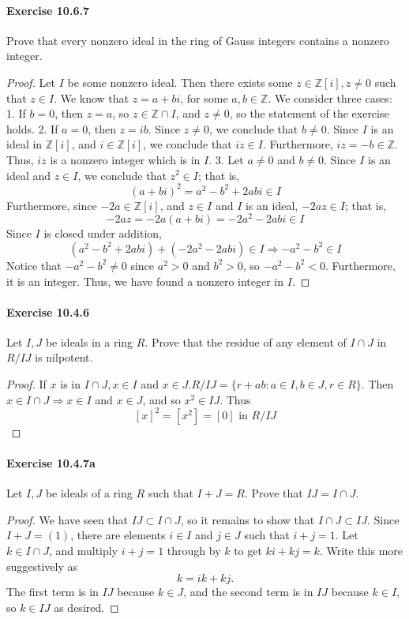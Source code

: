 \documentclass{article}
\begin{document}
\paragraph{Exercise 10.6.7} Prove that every nonzero ideal in the ring of Gauss integers contains a nonzero integer.
\begin{proof}
    Let $I$ be some nonzero ideal. Then there exists some $z \in \mathbb{Z}[i], z \neq 0$ such that $z \in I$. We know that $z=a+b i$, for some $a, b \in \mathbb{Z}$. We consider three cases:
1. If $b=0$, then $z=a$, so $z \in \mathbb{Z} \cap I$, and $z \neq 0$, so the statement of the exercise holds.
2. If $a=0$, then $z=i b$. Since $z \neq 0$, we conclude that $b \neq 0$. Since $I$ is an ideal in $\mathbb{Z}[i]$, and $i \in \mathbb{Z}[i]$, we conclude that $i z \in I$. Furthermore, $i z=-b \in \mathbb{Z}$. Thus, $i z$ is a nonzero integer which is in $I$.
3. Let $a \neq 0$ and $b \neq 0$. Since $I$ is an ideal and $z \in I$, we conclude that $z^2 \in I$; that is,
$$
(a+b i)^2=a^2-b^2+2 a b i \in I
$$
Furthermore, since $-2 a \in \mathbb{Z}[i]$, and $z \in I$ and $I$ is an ideal, $-2 a z \in I$; that is,
$$
-2 a z=-2 a(a+b i)=-2 a^2-2 a b i \in I
$$
Since $I$ is closed under addition,
$$
\left(a^2-b^2+2 a b i\right)+\left(-2 a^2-2 a b i\right) \in I \Longrightarrow-a^2-b^2 \in I
$$
Notice that $-a^2-b^2 \neq 0$ since $a^2>0$ and $b^2>0$, so $-a^2-b^2<0$. Furthermore, it is an integer. Thus, we have found a nonzero integer in $I$.
\end{proof}



\paragraph{Exercise 10.4.6} Let $I, J$ be ideals in a ring $R$. Prove that the residue of any element of $I \cap J$ in $R / I J$ is nilpotent.
\begin{proof}
    If $x$ is in $I \cap J, x \in I$ and $x \in J . R / I J=\{r+a b: a \in I, b \in J, r \in R\}$. Then $x \in I \cap J \Rightarrow x \in I$ and $x \in J$, and so $x^2 \in I J$. Thus
$$
[x]^2=\left[x^2\right]=[0] \text { in } R / I J
$$
\end{proof}



\paragraph{Exercise 10.4.7a} Let $I, J$ be ideals of a ring $R$ such that $I+J=R$. Prove that $I J=I \cap J$.
\begin{proof}
    We have seen that $IJ \subset I \cap J$, so it remains to show that $I \cap J \subset IJ$.  Since $I+J = (1)$, there are elements $i \in I$ and $j \in J$ such that $i+j = 1$.  Let $k \in I \cap J$, and multiply $i+j=1$ through by $k$ to get $ki+kj = k$.  Write this more suggestively as
\[ k = ik+kj. \]
The first term is in $IJ$ because $k \in J$, and the second term is in $IJ$ because $k \in I$, so $k \in IJ$ as desired.
\end{proof}
\end{document}
